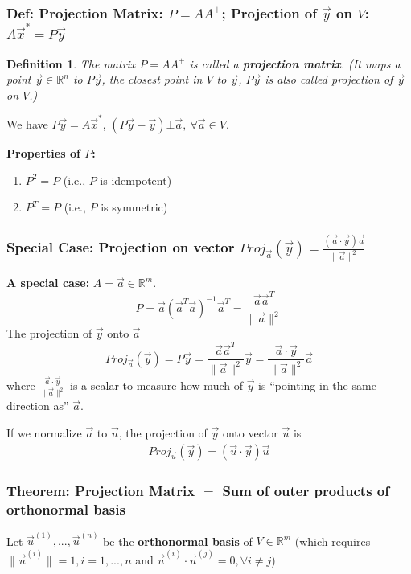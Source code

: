 \documentclass[11pt,a4paper]{article}
\newtheorem{definition}{Definition}
\begin{document}
\subsubsection{Def: Projection Matrix: $P=AA^+$; Projection of $\vec{y}$ on $V$: $A \vec{x}^*=P \vec{y}$}
\begin{definition}
    The matrix $P=AA^+$ is called a \textbf{projection matrix}. (It maps a point $\vec{y}\in \mathbb{R}^n$ to $P\vec{y}$, the closest point in $V$ to $\vec{y}$, $P\vec{y}$ is also called projection of $\vec{y}$ on $V$.)
\end{definition}
We have $P \vec{y}= A \vec{x}^*$, $(P \vec{y}-\vec{y})\bot \vec{a},\ \forall \vec{a}\in V$.

\textbf{Properties of $P$:}
\begin{enumerate}[$\bullet$]
    \item $P^2=P$ (i.e., $P$ is idempotent)
    \item $P^T=P$ (i.e., $P$ is symmetric)
\end{enumerate}

\subsubsection{Special Case: Projection on vector ${Proj}_{\vec{a}}(\vec{y})=\frac{(\vec{a}\cdot\vec{y})\vec{a}}{\|\vec{a}\|^2}$}

\textbf{A special case:} $A=\vec{a}\in \mathbb{R}^m$. $$P=\vec{a}(\vec{a}^T\vec{a})^{-1}\vec{a}^T=\frac{\vec{a}\vec{a}^T}{\|\vec{a}\|^2}$$
The projection of $\vec{y}$ onto $\vec{a}$ $${Proj}_{\vec{a}}(\vec{y})=P\vec{y}=\frac{\vec{a}\vec{a}^T}{\|\vec{a}\|^2}\vec{y}=\frac{\vec{a}\cdot\vec{y}}{\|\vec{a}\|^2}\vec{a}$$
where $\frac{\vec{a}\cdot\vec{y}}{\|\vec{a}\|^2}$ is a scalar to measure how much of $\vec{y}$ is “pointing in the same direction as” $\vec{a}$.

If we normalize $\vec{a}$ to $\vec{u}$, the projection of $\vec{y}$ onto vector $\vec{u}$ is
\begin{equation}
    \begin{aligned}
        {Proj}_{\vec{u}}(\vec{y})=(\vec{u}\cdot\vec{y})\vec{u}
    \end{aligned}
    \nonumber
\end{equation}

\subsubsection{Theorem: Projection Matrix $=$ Sum of outer products of orthonormal basis}
Let $\vec{u}^{(1)},...,\vec{u}^{(n)}$ be the \textbf{orthonormal basis} of $V\in \mathbb{R}^m$ (which requires $\|\vec{u}^{(i)}\|=1,i=1,...,n$ and $\vec{u}^{(i)}\cdot \vec{u}^{(j)}=0,\forall i\neq j$)
\end{document}
